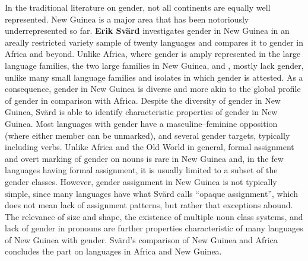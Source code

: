 \documentclass[output=collectionpaper]{langsci/langscibook}
\begin{document}
In the traditional literature on gender, not all continents are equally well represented. New Guinea is a major area that has been notoriously underrepresented so far. \textbf{Erik Svärd} investigates gender in New Guinea in an areally restricted variety sample of twenty languages and compares it to gender in Africa and beyond. Unlike Africa, where gender is amply represented in the large language families, the two large families in New Guinea,  and , mostly lack gender, unlike many small language families and isolates in which gender is attested. As a consequence, gender in New Guinea is diverse and more akin to the global profile of gender in comparison with Africa. Despite the diversity of gender in New Guinea, Svärd is able to identify characteristic properties of gender in New Guinea. Most languages with gender have a masculine--feminine opposition (where either member can be unmarked), and several gender targets, typically including verbs. Unlike Africa and the Old World in general, formal assignment and overt marking of gender on nouns is rare in New Guinea and, in the few languages having formal assignment, it is usually limited to a subset of the gender classes. However, gender assignment in New Guinea is not typically simple, since many languages have what Svärd calls ``opaque assignment'', which does not mean lack of assignment patterns, but rather that exceptions abound. The relevance of size and shape, the existence of multiple noun class systems, and lack of gender in pronouns are further properties characteristic of many languages of New Guinea with gender. Svärd’s comparison of New Guinea and Africa concludes the part on languages in Africa and New Guinea.
\end{document}
